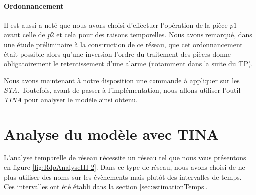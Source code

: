 \paragraph*{Ordonnancement}
Il est aussi a noté que nous avons choisi d'effectuer l'opération de la pièce $p1$ avant celle de $p2$ et cela pour des raisons temporelles. Nous avons remarqué, dans une étude préliminaire à la construction de ce réseau, que cet ordonnancement était possible alors qu'une inversion l'ordre du traitement des pièces donne obligatoirement le retentissement d'une alarme (notamment dans la suite du TP).


Nous avons maintenant à notre disposition une commande à appliquer sur les \emph{STA}. Toutefois, avant de passer à l'implémentation, nous allons utiliser l'outil \emph{TINA} pour analyser le modèle ainsi obtenu.	


\section{Analyse du modèle avec TINA}
L'analyse temporelle de réseau nécessite un réseau tel que nous vous présentons en figure \ref{fig:RdpAnalyseIII-2}. Dans ce type de réseau, nous avons choisi de ne plus utiliser des noms sur les évènements mais plutôt des intervalles de temps. Ces intervalles ont été établi dans la section \ref{sec:estimationTemps}.

